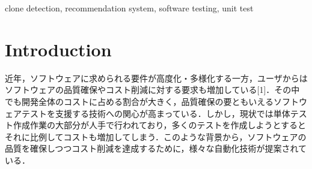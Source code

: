 \documentclass[conference]{IEEEtran}
\begin{document}
\begin{abstract}

\end{abstract}

\begin{IEEEkeywords}
 clone detection, recommendation system, software testing, unit test 
\end{IEEEkeywords}

\section{Introduction}
近年，ソフトウェアに求められる要件が高度化・多様化する一方，ユーザからはソフトウェアの品質確保やコスト削減に対する要求も増加している[1]．その中でも開発全体のコストに占める割合が大きく，品質確保の要ともいえるソフトウェアテストを支援する技術への関心が高まっている．しかし，現状では単体テスト作成作業の大部分が人手で行われており，多くのテストを作成しようとするとそれに比例してコストも増加してしまう．このような背景から，ソフトウェアの品質を確保しつつコスト削減を達成するために，様々な自動化技術が提案されている．
\end{document}
